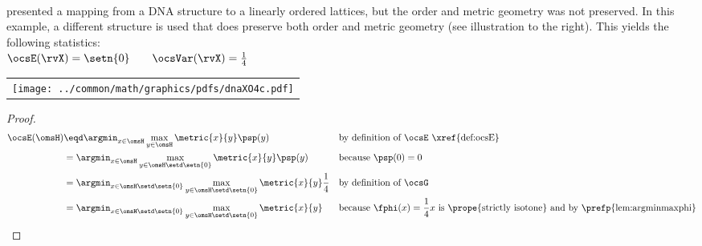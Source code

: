 \begin{tabstr}{0.75}
\begin{minipage}{\tw-70mm}%
\begin{example}
\label{ex:dnaXO4c}\mbox{}\\
 presented a mapping from a DNA structure to a linearly ordered lattices,
but the order and metric geometry was not preserved.
In this example, a different structure is used that does preserve both order and metric geometry
(see illustration to the right). This yields the following statistics:
\\\indentx$\ocsE(\rvX) = \setn{0} \qquad  \ocsVar (\rvX) = \frac{1}{4}$
\end{example}
\end{minipage}\hfill%
\begin{tabular}{c}
  \gsize%
  {\texttt{[image: ../common/math/graphics/pdfs/dnaXO4c.pdf]}}%
\end{tabular}
\begin{proof}
\begin{align*}
  \ocsE(\omsH)
    &\eqd \argmin_{x\in\omsH}\max_{y\in\omsH}\metric{x}{y}\psp(y)
    &&\text{by definition of $\ocsE$ \xref{def:ocsE}}
  \\&= \argmin_{x\in\omsH}\max_{y\in\omsH\setd\setn{0}}\metric{x}{y}\psp(y)
    &&\text{because $\psp(0)=0$}
  \\&= \argmin_{x\in\omsH\setd\setn{0}}\max_{y\in\omsH\setd\setn{0}}\metric{x}{y}\frac{1}{4}
    && \text{by definition of $\ocsG$}
  \\&= \argmin_{x\in\omsH\setd\setn{0}}\max_{y\in\omsH\setd\setn{0}}\metric{x}{y}
    && \text{because $\fphi(x)=\frac{1}{4}x$ is \prope{strictly isotone} and by \prefp{lem:argminmaxphi}}

\end{align*}
\end{proof}
\end{tabstr}
